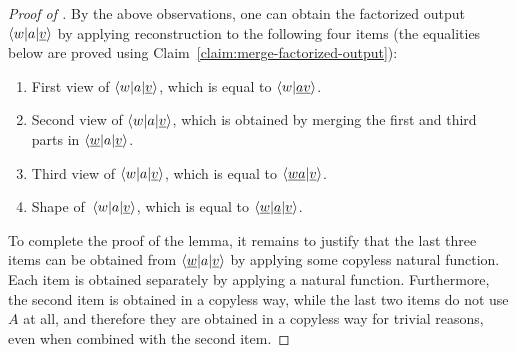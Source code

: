 \begin{proof}[Proof of ]
   By the above observations, one can obtain the factorized output $\langle w|a|\underline v \rangle$ by applying reconstruction to the  following four items (the equalities below are proved using  Claim~\ref{claim:merge-factorized-output}):
     \begin{enumerate}
        \item \label{it:first-view}First view of $\langle w|a|\underline v \rangle$, which is equal to $\langle w|\underline {av} \rangle$.
        \item  \label{it:second-view} Second view of $\langle w|a|\underline v \rangle$, which is obtained by merging the first and third parts in $\langle \underline w|a|\underline v \rangle$.
        \item \label{it:third-view}   Third view of $\langle w|a|\underline v \rangle$, which is equal to $\langle \underline {wa}|\underline{v} \rangle$.
        \item   \label{it:shape} Shape of~$\langle w|a|\underline v \rangle$, which is equal to $\langle \underline w|\underline a| \underline v \rangle$.
     \end{enumerate}
     To complete the proof of the lemma, it remains to justify that the last three items can be obtained from $\langle \underline w|a|\underline v \rangle$ by applying some copyless natural function. Each item is obtained separately by applying a natural function. Furthermore, the second item is obtained in a copyless way, while the last two items do not use $A$ at all, and therefore they are obtained in a copyless way for trivial reasons, even when combined with the second item.
\end{proof}


